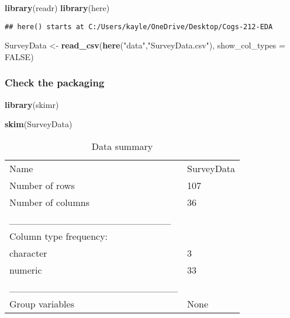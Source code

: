\documentclass[
]{article}
\newenvironment{Shaded}{\begin{snugshade}}{\end{snugshade}}
\newcommand{\AttributeTok}[1]{\textcolor[rgb]{0.13,0.29,0.53}{#1}}
\newcommand{\ConstantTok}[1]{\textcolor[rgb]{0.56,0.35,0.01}{#1}}
\newcommand{\FunctionTok}[1]{\textcolor[rgb]{0.13,0.29,0.53}{\textbf{#1}}}
\newcommand{\NormalTok}[1]{#1}
\newcommand{\OtherTok}[1]{\textcolor[rgb]{0.56,0.35,0.01}{#1}}
\newcommand{\StringTok}[1]{\textcolor[rgb]{0.31,0.60,0.02}{#1}}
\begin{document}
\begin{Shaded}
\begin{Highlighting}[]
\FunctionTok{library}\NormalTok{(readr)}
\FunctionTok{library}\NormalTok{(here)}
\end{Highlighting}
\end{Shaded}

\begin{verbatim}
## here() starts at C:/Users/kayle/OneDrive/Desktop/Cogs-212-EDA
\end{verbatim}

\begin{Shaded}
\begin{Highlighting}[]
\NormalTok{SurveyData }\OtherTok{\textless{}{-}} \FunctionTok{read\_csv}\NormalTok{(}\FunctionTok{here}\NormalTok{(}\StringTok{"data"}\NormalTok{,}\StringTok{"SurveyData.csv"}\NormalTok{), }\AttributeTok{show\_col\_types =} \ConstantTok{FALSE}\NormalTok{)}
\end{Highlighting}
\end{Shaded}

\hypertarget{check-the-packaging}{%
\subsubsection{Check the packaging}\label{check-the-packaging}}

\begin{Shaded}
\begin{Highlighting}[]
\FunctionTok{library}\NormalTok{(skimr)}

\FunctionTok{skim}\NormalTok{(SurveyData)}
\end{Highlighting}
\end{Shaded}

\begin{longtable}[]{@{}ll@{}}
\caption{Data summary}\tabularnewline
\toprule\noalign{}
\endfirsthead
\endhead
\bottomrule\noalign{}
\endlastfoot
Name & SurveyData \\
Number of rows & 107 \\
Number of columns & 36 \\
\_\_\_\_\_\_\_\_\_\_\_\_\_\_\_\_\_\_\_\_\_\_\_ & \\
Column type frequency: & \\
character & 3 \\
numeric & 33 \\
\_\_\_\_\_\_\_\_\_\_\_\_\_\_\_\_\_\_\_\_\_\_\_\_ & \\
Group variables & None \\
\end{longtable}
\end{document}
